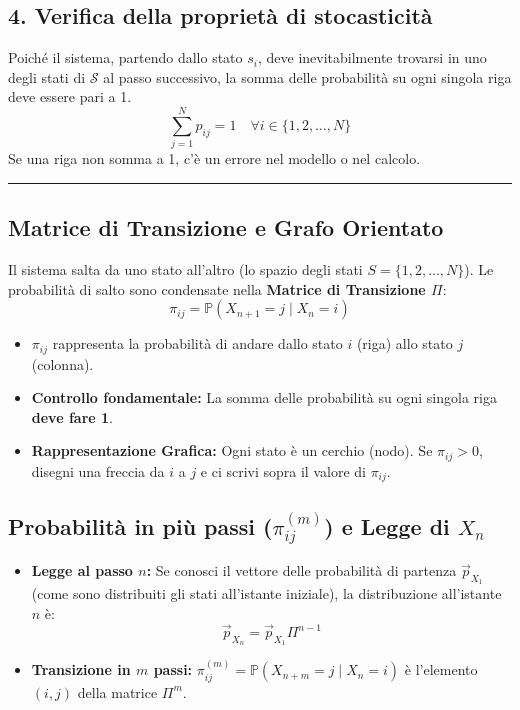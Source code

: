\documentclass[12pt]{extarticle} %
\begin{document}
\subsection*{4. Verifica della proprietà di stocasticità}
Poiché il sistema, partendo dallo stato $s_i$, deve inevitabilmente trovarsi in uno degli stati di $\mathcal{S}$ al passo successivo, la somma delle probabilità su ogni singola riga deve essere pari a 1. 
$$ \sum_{j=1}^{N} p_{ij} = 1 \quad \forall i \in \{1, 2, \dots, N\} $$
Se una riga non somma a 1, c'è un errore nel modello o nel calcolo.

\vspace{0.5cm}
\hrule
\vspace{0.5cm}

\subsection{Matrice di Transizione e Grafo Orientato}
Il sistema salta da uno stato all'altro (lo spazio degli stati $S = \{1, 2, \dots, N\}$). Le probabilità di salto sono condensate nella \textbf{Matrice di Transizione $\Pi$}:
$$ \pi_{ij} = \mathbb{P}(X_{n+1} = j \mid X_n = i) $$
\begin{itemize}
    \item $\pi_{ij}$ rappresenta la probabilità di andare dallo stato $i$ (riga) allo stato $j$ (colonna).
    \item \textbf{Controllo fondamentale:} La somma delle probabilità su ogni singola riga \textbf{deve fare 1}.
    \item \textbf{Rappresentazione Grafica:} Ogni stato è un cerchio (nodo). Se $\pi_{ij} > 0$, disegni una freccia da $i$ a $j$ e ci scrivi sopra il valore di $\pi_{ij}$.
\end{itemize}

\subsection{Probabilità in più passi ($\pi_{ij}^{(m)}$) e Legge di $X_n$}
\begin{itemize}
    \item \textbf{Legge al passo $n$:} Se conosci il vettore delle probabilità di partenza $\vec{p}_{X_1}$ (come sono distribuiti gli stati all'istante iniziale), la distribuzione all'istante $n$ è:
    $$ \vec{p}_{X_n} = \vec{p}_{X_1} \Pi^{n-1} $$
    \item \textbf{Transizione in $m$ passi:} $\pi_{ij}^{(m)} = \mathbb{P}(X_{n+m} = j \mid X_n = i)$ è l'elemento $(i,j)$ della matrice $\Pi^m$.
\end{itemize}
\end{document}
